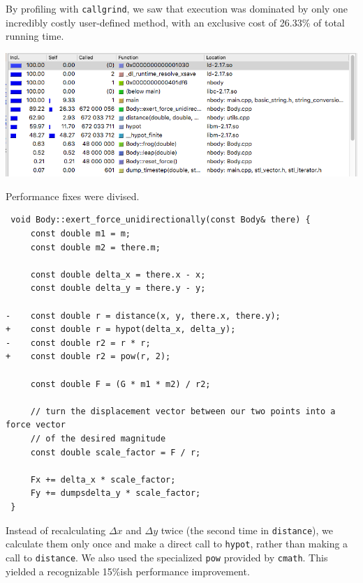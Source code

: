 \documentclass[11pt,a4paper]{article}
\begin{document}
By profiling with \texttt{callgrind}, we saw that execution was dominated by only one incredibly costly user-defined method, with an exclusive cost of 26.33\% of total running time.

\includegraphics[width=\textwidth]{profile}

Performance fixes were divised.

\begin{verbatim}
 void Body::exert_force_unidirectionally(const Body& there) {
     const double m1 = m;
     const double m2 = there.m;

     const double delta_x = there.x - x;
     const double delta_y = there.y - y;
     
-    const double r = distance(x, y, there.x, there.y);
+    const double r = hypot(delta_x, delta_y);
-    const double r2 = r * r;
+    const double r2 = pow(r, 2);

     const double F = (G * m1 * m2) / r2;

     // turn the displacement vector between our two points into a force vector
     // of the desired magnitude
     const double scale_factor = F / r;

     Fx += delta_x * scale_factor;
     Fy += dumpsdelta_y * scale_factor;
 }
\end{verbatim}

Instead of recalculating $\Delta x$ and $\Delta y$ twice (the second time in \texttt{distance}), we calculate them only once and make a direct call to \texttt{hypot}, rather than making a call to \texttt{distance}. We also used the specialized \texttt{pow} provided by \texttt{cmath}. This yielded a recognizable 15\%ish performance improvement. 
\end{document}
